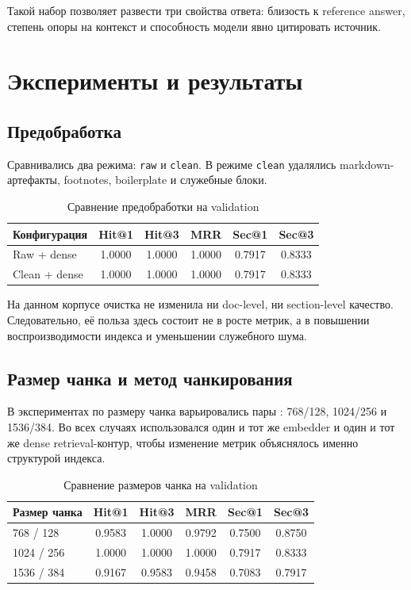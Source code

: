 \documentclass[12pt,a4paper]{article}
\begin{document}
Такой набор позволяет развести три свойства ответа: близость к reference answer, степень опоры на контекст и способность модели явно цитировать источник.

\section{Эксперименты и результаты}

\subsection{Предобработка}

Сравнивались два режима: \texttt{raw} и \texttt{clean}. В режиме \texttt{clean} удалялись markdown-артефакты, footnotes, boilerplate и служебные блоки.

\begin{table}[h]
\centering
\small
\begin{tabular}{lccccc}
\toprule
Конфигурация & Hit@1 & Hit@3 & MRR & Sec@1 & Sec@3 \\
\midrule
Raw + dense & 1.0000 & 1.0000 & 1.0000 & 0.7917 & 0.8333 \\
Clean + dense & 1.0000 & 1.0000 & 1.0000 & 0.7917 & 0.8333 \\
\bottomrule
\end{tabular}
\caption{Сравнение предобработки на validation}
\end{table}

На данном корпусе очистка не изменила ни doc-level, ни section-level качество. Следовательно, её польза здесь состоит не в росте метрик, а в повышении воспроизводимости индекса и уменьшении служебного шума.

\subsection{Размер чанка и метод чанкирования}

В экспериментах по размеру чанка варьировались пары : 768/128, 1024/256 и 1536/384. Во всех случаях использовался один и тот же embedder и один и тот же dense retrieval-контур, чтобы изменение метрик объяснялось именно структурой индекса.

\begin{table}[h]
\centering
\small
\begin{tabular}{p{5.4cm}ccccc}
\toprule
Размер чанка & Hit@1 & Hit@3 & MRR & Sec@1 & Sec@3 \\
\midrule
768 / 128 & 0.9583 & 1.0000 & 0.9792 & 0.7500 & 0.8750 \\
1024 / 256 & 1.0000 & 1.0000 & 1.0000 & 0.7917 & 0.8333 \\
1536 / 384 & 0.9167 & 0.9583 & 0.9458 & 0.7083 & 0.7917 \\
\bottomrule
\end{tabular}
\caption{Сравнение размеров чанка на validation}
\end{table}
\end{document}

